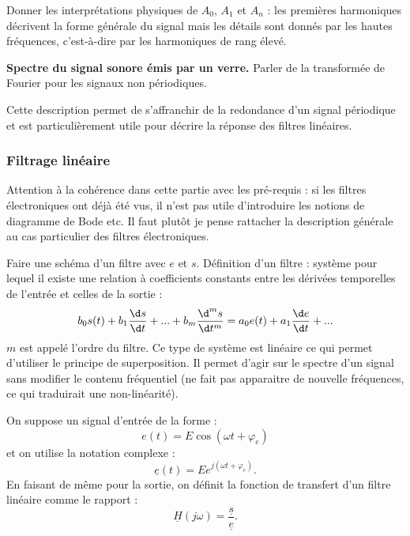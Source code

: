 Donner les interprétations physiques de $A_0$, $A_1$ et $A_n$ : les premières harmoniques décrivent la forme générale du signal mais les détails sont donnés par les hautes fréquences, c'est-à-dire par les harmoniques de rang élevé.

\begin{slide}
\textbf{Spectre du signal sonore émis par un verre.}
Parler de la transformée de Fourier pour les signaux non périodiques. 
\end{slide}

\begin{transition}
Cette description permet de s'affranchir de la redondance d'un signal périodique et est particulièrement utile pour décrire la réponse des filtres linéaires.
\end{transition}

\subsubsection{Filtrage linéaire}

\begin{remarque}
Attention à la cohérence dans cette partie avec les pré-requis : si les filtres électroniques ont déjà été vus, il n'est pas utile d'introduire les notions de diagramme de Bode etc.
Il faut plutôt je pense rattacher la description générale au cas particulier des filtres électroniques.
\end{remarque}

Faire une schéma d'un filtre avec $e$ et $s$.
Définition d'un filtre : système pour lequel il existe une relation à coefficients constants entre les dérivées temporelles de l'entrée et celles de la sortie :
\begin{equation}
b_0 s(t) + b_1 \frac{\d s}{\d t} + ... + b_m \frac{\d^m s}{\d t^m} = a_0 e(t) + a_1 \frac{\d e}{\d t}+ ...
\end{equation}
$m$ est appelé l'ordre du filtre.
Ce type de système est linéaire ce qui permet d'utiliser le principe de superposition.
Il permet d'agir sur le spectre d'un signal sans modifier le contenu fréquentiel (ne fait pas apparaitre de nouvelle fréquences, ce qui traduirait une non-linéarité).

On suppose un signal d'entrée de la forme :
\begin{equation}
e(t) = E\cos(\omega t+\varphi_e)
\end{equation}
et on utilise la notation complexe :
\begin{equation}
\underline{e}(t) = E e^{j(\omega t + \varphi_e)}.
\end{equation}
En faisant de même pour la sortie, on définit la fonction de transfert d'un filtre linéaire comme le rapport :
\begin{equation}
\underline{H}(j\omega) = \frac{\underline{s}}{\underline{e}}.
\end{equation}

